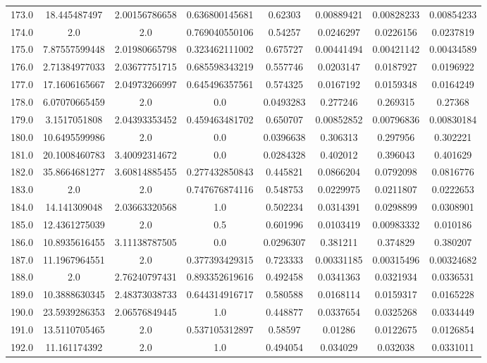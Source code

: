 \begin{longtable}{|c|c|c|c|c|c|c|c|}
173.0 & 18.445487497 & 2.00156786658 & 0.636800145681 & 0.62303 & 0.00889421 & 0.00828233 & 0.00854233 \\
174.0 & 2.0 & 2.0 & 0.769040550106 & 0.54257 & 0.0246297 & 0.0226156 & 0.0237819 \\
175.0 & 7.87557599448 & 2.01980665798 & 0.323462111002 & 0.675727 & 0.00441494 & 0.00421142 & 0.00434589 \\
176.0 & 2.71384977033 & 2.03677751715 & 0.685598343219 & 0.557746 & 0.0203147 & 0.0187927 & 0.0196922 \\
177.0 & 17.1606165667 & 2.04973266997 & 0.645496357561 & 0.574325 & 0.0167192 & 0.0159348 & 0.0164249 \\
178.0 & 6.07070665459 & 2.0 & 0.0 & 0.0493283 & 0.277246 & 0.269315 & 0.27368 \\
179.0 & 3.1517051808 & 2.04393353452 & 0.459463481702 & 0.650707 & 0.00852852 & 0.00796836 & 0.00830184 \\
180.0 & 10.6495599986 & 2.0 & 0.0 & 0.0396638 & 0.306313 & 0.297956 & 0.302221 \\
181.0 & 20.1008460783 & 3.40092314672 & 0.0 & 0.0284328 & 0.402012 & 0.396043 & 0.401629 \\
182.0 & 35.8664681277 & 3.60814885455 & 0.277432850843 & 0.445821 & 0.0866204 & 0.0792098 & 0.0816776 \\
183.0 & 2.0 & 2.0 & 0.747676874116 & 0.548753 & 0.0229975 & 0.0211807 & 0.0222653 \\
184.0 & 14.141309048 & 2.03663320568 & 1.0 & 0.502234 & 0.0314391 & 0.0298899 & 0.0308901 \\
185.0 & 12.4361275039 & 2.0 & 0.5 & 0.601996 & 0.0103419 & 0.00983332 & 0.010186 \\
186.0 & 10.8935616455 & 3.11138787505 & 0.0 & 0.0296307 & 0.381211 & 0.374829 & 0.380207 \\
187.0 & 11.1967964551 & 2.0 & 0.377393429315 & 0.723333 & 0.00331185 & 0.00315496 & 0.00324682 \\
188.0 & 2.0 & 2.76240797431 & 0.893352619616 & 0.492458 & 0.0341363 & 0.0321934 & 0.0336531 \\
189.0 & 10.3888630345 & 2.48373038733 & 0.644314916717 & 0.580588 & 0.0168114 & 0.0159317 & 0.0165228 \\
190.0 & 23.5939286353 & 2.06576849445 & 1.0 & 0.448877 & 0.0337654 & 0.0325268 & 0.0334449 \\
191.0 & 13.5110705465 & 2.0 & 0.537105312897 & 0.58597 & 0.01286 & 0.0122675 & 0.0126854 \\
192.0 & 11.161174392 & 2.0 & 1.0 & 0.494054 & 0.034029 & 0.032038 & 0.0331011 \\

\end{longtable}
